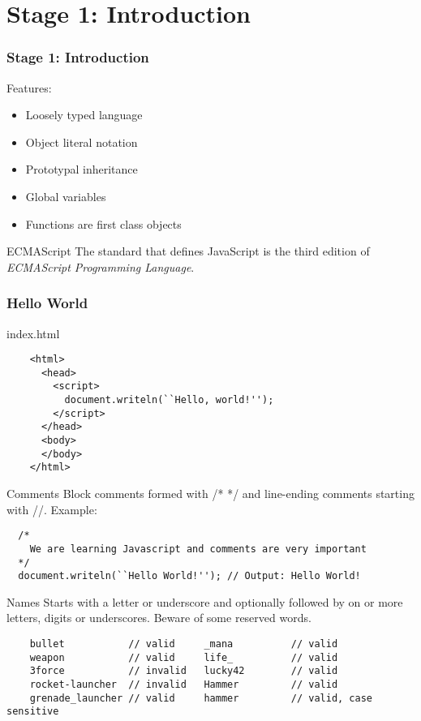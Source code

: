 \section{Stage 1: Introduction}

\begin{frame}
  \frametitle{Stage 1: Introduction}
  Features:
  \begin{itemize}
    \item Loosely typed language
    \item Object literal notation
    \item Prototypal inheritance
    \item Global variables
    \item Functions are first class objects
  \end{itemize}
\end{frame}

\begin{frame}
  \begin{block}{ECMAScript}
    The standard that defines JavaScript is the third edition of \textit{ECMAScript Programming Language}.
  \end{block}
\end{frame}

\begin{frame}[fragile]
  \frametitle{Hello World}

  \begin{block}{index.html}
    {\scriptsize
    \begin{verbatim}
    <html>
      <head>
        <script>
          document.writeln(``Hello, world!'');
        </script>
      </head>
      <body>
      </body>
    </html>
    \end{verbatim}
    }
  \end{block}
\end{frame}

\begin{frame}[fragile]
  \begin{block}{Comments}
  Block comments formed with /* */ and line-ending comments starting with //. Example:
  {\scriptsize
  \begin{verbatim}
  /* 
    We are learning Javascript and comments are very important
  */
  document.writeln(``Hello World!''); // Output: Hello World!
  \end{verbatim}
  }
  \end{block}
  
  \begin{block}{Names}
    Starts with a letter or underscore and optionally followed by on or more letters, digits or underscores. Beware of some reserved words.
    {\scriptsize
    \begin{verbatim}
    bullet           // valid     _mana          // valid
    weapon           // valid     life_          // valid
    3force 	         // invalid   lucky42        // valid
    rocket-launcher  // invalid   Hammer         // valid
    grenade_launcher // valid     hammer         // valid, case sensitive
    \end{verbatim}
    }
  \end{block}
\end{frame}

